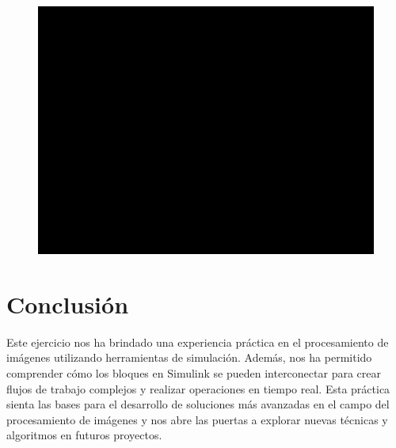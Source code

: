 \documentclass{article}
\begin{document}
	\begin{figure}[!]
		\centering
		\includegraphics[width=15cm]{img2.png}
	\end{figure}
	
	\newpage
	
	\section{Conclusión}
	
	Este ejercicio nos ha brindado una experiencia práctica en el procesamiento de imágenes utilizando herramientas de simulación. Además, nos ha permitido comprender cómo los bloques en Simulink se pueden interconectar para crear flujos de trabajo complejos y realizar operaciones en tiempo real. Esta práctica sienta las bases para el desarrollo de soluciones más avanzadas en el campo del procesamiento de imágenes y nos abre las puertas a explorar nuevas técnicas y algoritmos en futuros proyectos.
	
\end{document}
